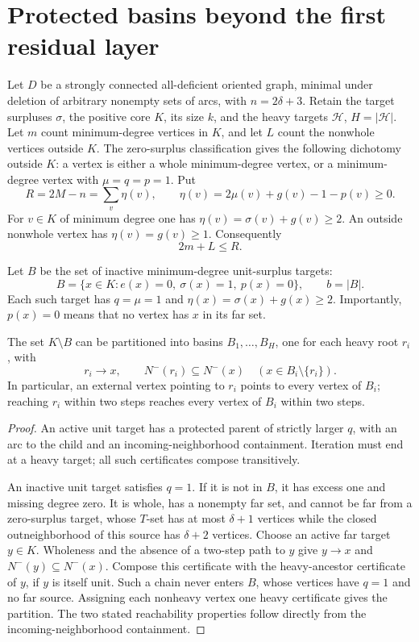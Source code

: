 \section{Protected basins beyond the first residual layer}
\label{sec:general-residual-basins}

Let $D$ be a strongly connected all-deficient oriented graph, minimal
under deletion of arbitrary nonempty sets of arcs, with
$n=2\delta+3$.  Retain the target surpluses $\sigma$, the positive
core $K$, its size $k$, and the heavy targets $\mathcal H$,
$H=|\mathcal H|$.  Let $m$ count minimum-degree vertices in $K$,
and let $L$ count the nonwhole vertices outside $K$.
The zero-surplus classification gives the following dichotomy
outside $K$: a vertex is either a whole minimum-degree vertex, or
a minimum-degree vertex with $\mu=q=p=1$.  Put
\[
 R=2M-n=\sum_v\eta(v),\qquad
 \eta(v)=2\mu(v)+g(v)-1-p(v)\ge0.
\]
For $v\in K$ of minimum degree one has $\eta(v)=\sigma(v)+g(v)\ge2$.
An outside nonwhole vertex has $\eta(v)=g(v)\ge1$.
Consequently
\begin{equation}\label{eq:general-min-leaf-budget}
 {2m+L\le R.}
\end{equation}

Let $B$ be the set of inactive minimum-degree unit-surplus targets:
\[
 B=\{x\in K:e(x)=0,\ \sigma(x)=1,\ p(x)=0\},\qquad b=|B|.
\]
Each such target has $q=\mu=1$ and
$\eta(x)=\sigma(x)+g(x)\ge2$.  Importantly, $p(x)=0$ means
that no vertex has $x$ in its far set.

\begin{lemma}
\label{lem:general-basin-certificates}
The set $K\setminus B$ can be partitioned into basins
$B_1,\ldots,B_H$, one for each heavy root $r_i$, with
\[
 r_i\to x,\qquad N^-(r_i)\subseteq N^-(x)
       \quad(x\in B_i\setminus\{r_i\}).
\]
In particular, an external vertex pointing to $r_i$ points to
every vertex of $B_i$; reaching $r_i$ within two steps reaches
every vertex of $B_i$ within two steps.
\end{lemma}
\begin{proof}
An active unit target has a protected parent of strictly larger
$q$, with an arc to the child and an incoming-neighborhood
containment.  Iteration must end at a heavy target; all such
certificates compose transitively.

An inactive unit target satisfies $q=1$.  If it is not in $B$,
it has excess one and missing degree zero.  It is whole, has a
nonempty far set, and cannot be far from a zero-surplus target,
whose $T$-set has at most $\delta+1$ vertices while the closed
outneighborhood of this source has $\delta+2$ vertices.
Choose an active far target $y\in K$.
Wholeness and the absence of a two-step path to $y$ give
$y\to x$ and $N^-(y)\subseteq N^-(x)$.
Compose this certificate with the heavy-ancestor certificate of
$y$, if $y$ is itself unit.  Such a chain never enters $B$,
whose vertices have $q=1$ and no far source.
Assigning each nonheavy vertex one heavy certificate gives the
partition.  The two stated reachability properties follow directly
from the incoming-neighborhood containment.
\end{proof}

